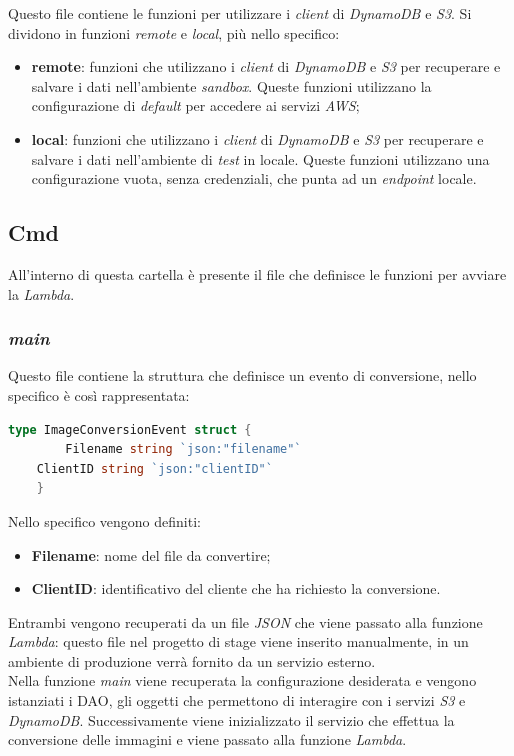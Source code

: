 Questo file contiene le funzioni per utilizzare i \emph{client} di
\emph{DynamoDB} e \emph{S3}. Si dividono in funzioni \emph{remote} e
\emph{local}, più nello specifico:
\begin{itemize}
    \item \textbf{remote}: funzioni che utilizzano i \emph{client} di
          \emph{DynamoDB} e \emph{S3} per recuperare e salvare i dati nell'ambiente
          \emph{sandbox}. Queste funzioni utilizzano la configurazione di
          \emph{default} per accedere ai servizi \emph{AWS};
    \item \textbf{local}: funzioni che utilizzano i \emph{client} di
          \emph{DynamoDB} e \emph{S3} per recuperare e salvare i dati nell'ambiente di
          \emph{test} in locale. Queste funzioni utilizzano una configurazione vuota,
          senza credenziali, che punta ad un \emph{endpoint} locale.
\end{itemize}

\subsection{Cmd}

All'interno di questa cartella è presente il file che definisce le funzioni per
avviare la \emph{Lambda}.

\subsubsection{\emph{main}}

Questo file contiene la struttura che definisce un evento di conversione, nello
specifico è così rappresentata:
\begin{lstlisting}[language=go]
    type ImageConversionEvent struct {
        Filename string `json:"filename"`
	ClientID string `json:"clientID"`
    }
\end{lstlisting}


Nello specifico vengono definiti:
\begin{itemize}
    \item \textbf{Filename}: nome del file da convertire;
    \item \textbf{ClientID}: identificativo del cliente che ha richiesto la
          conversione.
\end{itemize}
Entrambi vengono recuperati da un file \emph{JSON} che viene passato alla
funzione \emph{Lambda}: questo file nel progetto di stage viene inserito
manualmente, in un ambiente di produzione verrà fornito da un servizio
esterno.\\
Nella funzione \emph{main} viene recuperata la configurazione desiderata e
vengono istanziati i \glsfirstoccur\gls{DAO}, gli oggetti che permettono di
interagire con i servizi \emph{S3} e \emph{DynamoDB}. Successivamente viene
inizializzato il servizio che effettua la conversione delle immagini e viene
passato alla funzione \emph{Lambda}.

